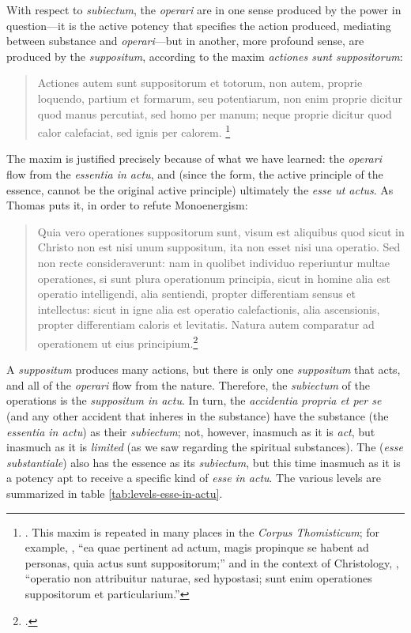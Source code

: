 With respect to \emph{subiectum}, the \emph{operari} are in one sense produced by the power in question---it is the active potency that specifies the action produced, mediating between substance and   \emph{operari}---but in another, more profound sense, are produced by the \emph{suppositum}, according to the maxim \emph{actiones sunt suppositorum}:
%
\begin{quotation}
Actiones autem sunt suppositorum et totorum, non autem, proprie loquendo, partium et formarum, seu potentiarum, non enim proprie dicitur quod manus percutiat, sed homo per manum; neque proprie dicitur quod calor calefaciat, sed ignis per calorem.%
%
\footnote{\Cite[II-II, q.~58, a.~2, co.]{st:summa}. This maxim is repeated in many places in the \emph{Corpus Thomisticum}; for example, \cite[I, q.~39, a.~5]{st:summa}, ``ea quae pertinent ad actum, magis propinque se habent ad personas, quia actus sunt suppositorum;'' and in the context of Christology, \cite[20, a.~1, arg.~2]{st:deveritate}, ``operatio non attribuitur naturae, sed hypostasi; sunt enim operationes suppositorum et particularium.''}
\end{quotation}
%
The maxim is justified precisely because of what we have learned: the \emph{operari} flow from the \emph{essentia in actu}, and (since the form, the active principle of the essence, cannot be the original active principle) ultimately the \emph{esse ut actus}. As Thomas puts it, in order to refute Monoenergism:
%
\begin{quotation}
Quia vero operationes suppositorum sunt, visum est aliquibus quod sicut in Christo non est nisi unum suppositum, ita non esset nisi una operatio. Sed non recte consideraverunt: nam in quolibet individuo reperiuntur multae operationes, si sunt plura operationum principia, sicut in homine alia est operatio intelligendi, alia sentiendi, propter differentiam sensus et intellectus: sicut in igne alia est operatio calefactionis, alia ascensionis, propter differentiam caloris et levitatis. Natura autem comparatur ad operationem ut eius principium.\footcite[I, cap.~212]{st:compendium}
\end{quotation}
%
A \emph{suppositum} produces many actions, but there is only one \emph{suppositum} that acts, and all of the \emph{operari} flow from the nature. Therefore, the \emph{subiectum} of the operations is the \emph{suppositum in actu}. In turn, the \emph{accidentia propria et per se} (and any other accident that inheres in the substance) have the substance (the \emph{essentia in actu}) as their \emph{subiectum}; not, however, inasmuch as it is \emph{act}, but inasmuch as it is \emph{limited} (as we saw regarding the spiritual substances). The (\emph{esse substantiale}) also has the essence as its \emph{subiectum}, but this time inasmuch as it is a potency apt to receive a specific kind of \emph{esse in actu}. The various levels are summarized in table \ref{tab:levels-esse-in-actu}.%
